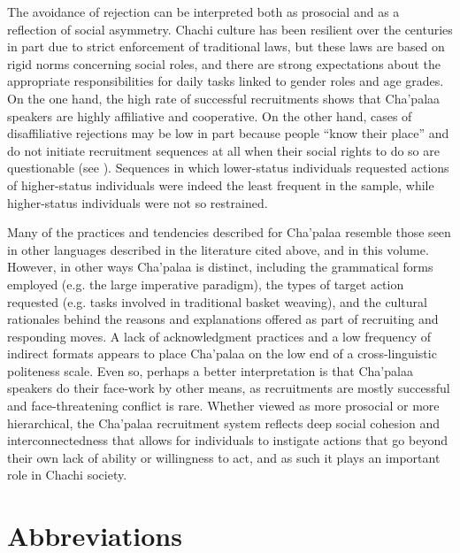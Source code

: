 \documentclass[output=paper]{langsci/langscibook}
\begin{document}
The avoidance of rejection can be interpreted both as prosocial and as a reflection of social asymmetry. Chachi culture has been resilient over the centuries in part due to strict enforcement of traditional laws, but these laws are based on rigid norms concerning social roles, and there are strong expectations about the appropriate responsibilities for daily tasks linked to gender roles and age grades. On the one hand, the high rate of successful recruitments shows that Cha’palaa speakers are highly affiliative and cooperative. On the other hand, cases of disaffiliative rejections may be low in part because people “know their place” and do not initiate recruitment sequences at all when their social rights to do so are questionable (see \citealt{Floyd2017}). Sequences in which lower-status individuals requested actions of higher-status individuals were indeed the least frequent in the sample, while higher-status individuals were not so restrained.

Many of the practices and tendencies described for Cha'palaa resemble those seen in other languages described in the literature cited above, and in this volume. However, in other ways Cha’palaa is distinct, including the grammatical forms employed (e.g. the large imperative paradigm), the types of target action requested (e.g. tasks involved in traditional basket weaving), and the cultural rationales behind the reasons and explanations offered as part of recruiting and responding moves. A lack of acknowledgment practices and a low frequency of indirect formats appears to place Cha’palaa on the low end of a cross-linguistic politeness scale. Even so, perhaps a better interpretation is that Cha’palaa speakers do their face-work by other means, as recruitments are mostly successful and face-threatening conflict is rare. Whether viewed as more prosocial or more hierarchical, the Cha’palaa recruitment system reflects deep social cohesion and interconnectedness that allows for individuals to instigate actions that go beyond their own lack of ability or willingness to act, and as such it plays an important role in Chachi society.

\section*{Abbreviations}
\end{document}
